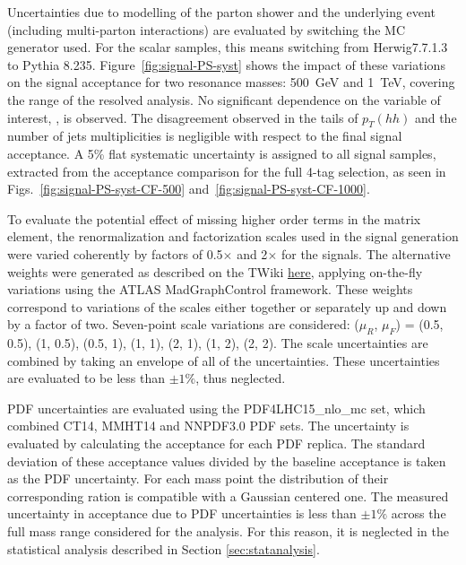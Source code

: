 Uncertainties due to modelling of the parton shower and the underlying event
(including multi-parton interactions) are evaluated by switching the MC generator
used. For the scalar samples, this means switching from Herwig7.7.1.3
to Pythia 8.235. Figure~\ref{fig:signal-PS-syst} shows the impact of these variations on the signal acceptance 
for two resonance masses: \SI{500}{\GeV} and \SI{1}{\TeV}, covering the range of the resolved analysis. 
No significant dependence on the variable of interest, \mhh, is observed. The disagreement observed in the tails 
of $p_T (hh)$ and the number of jets multiplicities is negligible with respect to the final signal acceptance. 
A 5\% flat systematic uncertainty is assigned to all signal samples, extracted from the acceptance comparison
for the full 4-tag selection, as seen in Figs.~\ref{fig:signal-PS-syst-CF-500} and~\ref{fig:signal-PS-syst-CF-1000}. 




To evaluate the potential effect of missing higher order terms in the matrix
element, the renormalization and factorization scales used in the signal
generation were varied coherently by factors of 0.5$\times$ and 2$\times$ for
the signals. The alternative weights were generated as described on the TWiki
\href{https://twiki.cern.ch/twiki/bin/viewauth/AtlasProtected/SignalTheoryUncertainties?rev=2}{here},
applying on-the-fly variations using the ATLAS MadGraphControl framework. These
weights correspond to variations of the scales either together or separately up
and down by a factor of two. Seven-point scale variations are considered:
($\mu_R$, $\mu_F$) = (0.5, 0.5), (1, 0.5), (0.5, 1), (1, 1), (2, 1), (1, 2), (2,
2). The scale uncertainties are combined by taking an envelope of all of the
uncertainties. These uncertainties are evaluated to be less than $\pm1\%$, thus
neglected.

PDF uncertainties are evaluated using the PDF4LHC15_nlo_mc set, which combined CT14,
MMHT14 and NNPDF3.0 PDF sets. The uncertainty is evaluated by
calculating the acceptance for each PDF replica. The standard deviation of these
acceptance values divided by the baseline acceptance is taken as the PDF uncertainty.
For each mass point the distribution of their corresponding ration is compatible
with a Gaussian centered one. The measured 
uncertainty in acceptance due to PDF uncertainties is less than $\pm1\%$ across the
full mass range considered for the analysis. For this reason, it is
neglected in the statistical analysis described in Section \ref{sec:statanalysis}.

